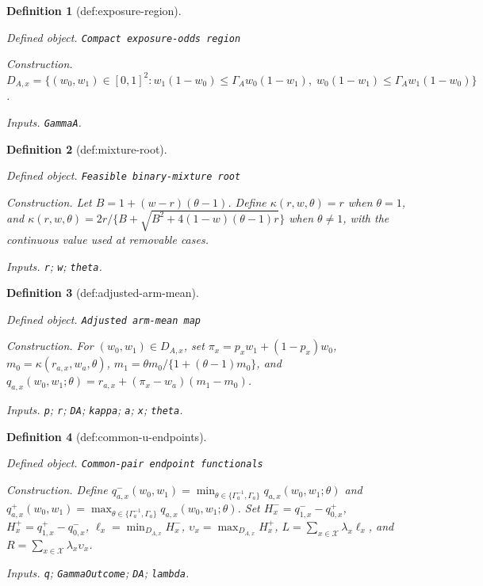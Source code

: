 \documentclass{article}
\newtheorem{definition}{Definition}
\begin{document}
\begin{definition}[def:exposure-region]\label{def:exposure-region}
\par\smallskip\noindent\emph{Defined object.} \texttt{Compact exposure-\allowbreak{}odds region}
\par\smallskip\noindent\emph{Construction.} \(D_{A,x}=\{(w_0,w_1)\in[0,1]^2:w_1(1-w_0)\leq\Gamma_Aw_0(1-w_1),\;w_0(1-w_1)\leq\Gamma_Aw_1(1-w_0)\}\).
\par\smallskip\noindent\emph{Inputs.} \texttt{GammaA}.
\end{definition}

\begin{definition}[def:mixture-root]\label{def:mixture-root}
\par\smallskip\noindent\emph{Defined object.} \texttt{Feasible binary-\allowbreak{}mixture root}
\par\smallskip\noindent\emph{Construction.} Let \(B=1+(w-r)(\theta-1)\).  Define \(\kappa(r,w,\theta)=r\) when \(\theta=1\), and \(\kappa(r,w,\theta)=2r/\{B+\sqrt{B^2+4(1-w)(\theta-1)r}\}\) when \(\theta\neq1\), with the continuous value used at removable cases.
\par\smallskip\noindent\emph{Inputs.} \texttt{r}; \texttt{w}; \texttt{theta}.
\end{definition}

\begin{definition}[def:adjusted-arm-mean]\label{def:adjusted-arm-mean}
\par\smallskip\noindent\emph{Defined object.} \texttt{Adjusted arm-\allowbreak{}mean map}
\par\smallskip\noindent\emph{Construction.} For \((w_0,w_1)\in D_{A,x}\), set \(\pi_x=p_xw_1+(1-p_x)w_0\), \(m_0=\kappa(r_{a,x},w_a,\theta)\), \(m_1=\theta m_0/\{1+(\theta-1)m_0\}\), and \(q_{a,x}(w_0,w_1;\theta)=r_{a,x}+(\pi_x-w_a)(m_1-m_0)\).
\par\smallskip\noindent\emph{Inputs.} \texttt{p}; \texttt{r}; \texttt{DA}; \texttt{kappa}; \texttt{a}; \texttt{x}; \texttt{theta}.
\end{definition}

\begin{definition}[def:common-u-endpoints]\label{def:common-u-endpoints}
\par\smallskip\noindent\emph{Defined object.} \texttt{Common-\allowbreak{}pair endpoint functionals}
\par\smallskip\noindent\emph{Construction.} Define \(q^-_{a,x}(w_0,w_1)=\min_{\theta\in\{\Gamma_a^{-1},\Gamma_a\}}q_{a,x}(w_0,w_1;\theta)\) and \(q^+_{a,x}(w_0,w_1)=\max_{\theta\in\{\Gamma_a^{-1},\Gamma_a\}}q_{a,x}(w_0,w_1;\theta)\).  Set \(H^-_x=q^-_{1,x}-q^+_{0,x}\), \(H^+_x=q^+_{1,x}-q^-_{0,x}\), \(\ell_x=\min_{D_{A,x}}H^-_x\), \(\upsilon_x=\max_{D_{A,x}}H^+_x\), \(L=\sum_{x\in\mathcal X}\lambda_x\ell_x\), and \(R=\sum_{x\in\mathcal X}\lambda_x\upsilon_x\).
\par\smallskip\noindent\emph{Inputs.} \texttt{q}; \texttt{GammaOutcome}; \texttt{DA}; \texttt{lambda}.
\end{definition}
\end{document}

